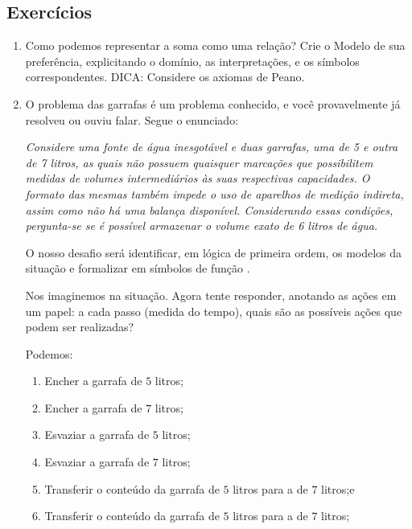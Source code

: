   
  \subsection{Exercícios}
    
    \begin{enumerate}
       
   \item Como podemos representar a soma como uma relação? Crie o Modelo de sua preferência, explicitando o domínio, as interpretações, e os símbolos correspondentes. DICA: Considere os axiomas de Peano.
    
     \item O problema das garrafas é um problema conhecido, e você provavelmente já resolveu ou ouviu falar. Segue o enunciado:
    
    \vspace{0.2cm}
    
    \textit{Considere uma fonte de água inesgotável e duas garrafas, uma de 5 e outra de 7 litros, as quais não possuem quaisquer marcações que possibilitem medidas de volumes intermediários às suas respectivas capacidades. O formato das mesmas também impede o uso de aparelhos de medição indireta, assim como não há uma balança disponível. Considerando essas condições, pergunta-se se é possível armazenar o volume exato de 6 litros de água.}
    
    \vspace{0.2cm}
    
    O nosso desafio será identificar, em lógica de primeira ordem, os modelos da situação e formalizar em símbolos de função .
    
    \vspace{0.2cm}
    
    Nos imaginemos na situação. Agora tente responder, anotando as ações em um papel: a cada passo (medida do tempo), quais são as possíveis ações que podem ser realizadas?
    
    \vspace{0.2cm}
    
    Podemos:
    
    \begin{enumerate}
        \item Encher a garrafa de $5$ litros;
        \item Encher a garrafa de $7$ litros;
        \item Esvaziar a garrafa de $5$ litros;
        \item Esvaziar a garrafa de $7$ litros;
        \item Transferir o conteúdo da garrafa de $5$ litros para a de $7$ litros;e
        \item Transferir o conteúdo da garrafa de $5$ litros para a de $7$ litros;
    \end{enumerate}
    

\end{enumerate}
